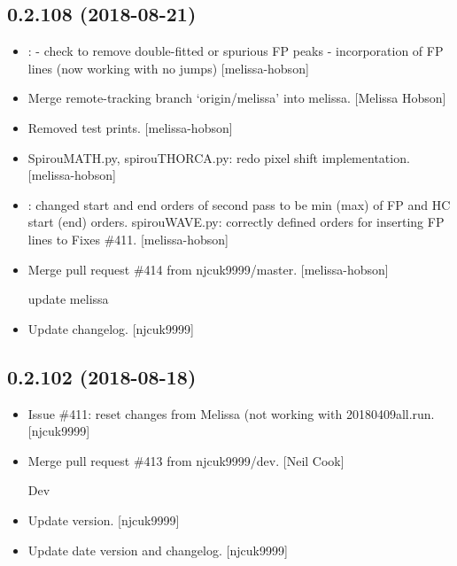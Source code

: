 \documentclass[a4paper,10pt,english]{report}
\begin{document}
\subsection{0.2.108 (2018-08-21)}
\label{\detokenize{misc/changelog:id359}}\begin{itemize}
\item {} 
: - check to remove double-fitted or
spurious FP peaks - incorporation of FP lines (now working with no
jumps) {[}melissa-hobson{]}

\item {} 
Merge remote-tracking branch ‘origin/melissa’ into melissa. {[}Melissa
Hobson{]}

\item {} 
Removed test prints. {[}melissa-hobson{]}

\item {} 
SpirouMATH.py, spirouTHORCA.py: redo pixel shift implementation.
{[}melissa-hobson{]}

\item {} 
: changed start and end orders of second pass to
be min (max) of FP and HC start (end) orders. spirouWAVE.py: correctly
defined orders for inserting FP lines to  Fixes \#411.
{[}melissa-hobson{]}

\item {} 
Merge pull request \#414 from njcuk9999/master. {[}melissa-hobson{]}

update melissa

\item {} 
Update changelog. {[}njcuk9999{]}

\end{itemize}


\subsection{0.2.102 (2018-08-18)}
\label{\detokenize{misc/changelog:id360}}\begin{itemize}
\item {} 
Issue \#411: reset  changes from Melissa (not working with
 20180409all.run. {[}njcuk9999{]}

\item {} 
Merge pull request \#413 from njcuk9999/dev. {[}Neil Cook{]}

Dev

\item {} 
Update version. {[}njcuk9999{]}

\item {} 
Update date version and changelog. {[}njcuk9999{]}

\end{itemize}
\end{document}
